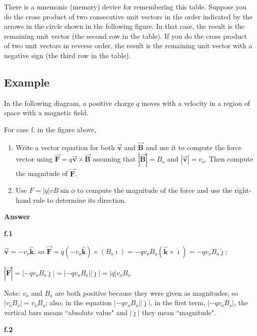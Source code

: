 \documentclass{article}
\newcommand{\ihat}[0]{\hat{\boldsymbol{\imath}}}
\newcommand{\jhat}[0]{\hat{\boldsymbol{\jmath}}}
\newcommand{\khat}[0]{\hat{\boldsymbol{k}}}
\newcommand{\bfvec}[1]{\vec{\mathbf{#1}}}
\begin{document}
There is a mnemonic (memory) device for remembering this table. Suppose you do the cross product of two consecutive unit vectors in the order indicated by the arrows in the circle shown in the following figure. In that case, the result is the remaining unit vector (the second row in the table). If you do the cross product of two unit vectors in reverse order, the result is the remaining unit vector with a negative sign (the third row in the table).



\ifsolutions\else
\newpage
\fi

\subsection{Example}

In the following diagram, a positive charge $q$ moves with a velocity in a region of space with a magnetic field.



For case f. in the figure above,

\begin{enumerate}

  \item Write a vector equation for both $\bfvec{v}$ and $\bfvec{B}$ and use it to compute the force vector using $\bfvec{F} = q\bfvec{v}\times\bfvec{B}$ assuming that $|\bfvec{B}|=B_o$ and $|\bfvec{v}|=v_o$. Then compute the magnitude of $\bfvec{F}$.

  \item Use $F = |q|vB\sin\phi$ to compute the magnitude of the force and use the right-hand rule to determine its direction.

\end{enumerate}

\textbf{Answer}

\textbf{f.1}

$\bfvec{v}=-v_o\khat$, so $\bfvec{F} = q(-v_o\khat)\times (B_o\ihat)=-qv_oB_o(\khat\times \ihat)=-qv_oB_o\jhat$;

$|\bfvec{F}|=|-qv_oB_o\jhat| = |-qv_oB_o||\jhat|=|q|v_oB_o$

Note: $v_o$ and $B_o$ are both positive because they were given as magnitudes, so $|v_oB_o|=v_oB_o$; also, in the equation $|-qv_oB_o||\jhat|$, in the first term, $|-qv_oB_o|$, the vertical bars means ``absolute value" and $|\jhat|$ they mean ``magnitude".

\textbf{f.2}
\end{document}
